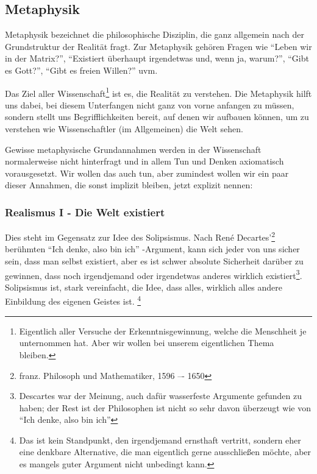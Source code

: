 
\subsection{Metaphysik}

Metaphysik bezeichnet die philosophische Disziplin, die ganz allgemein nach der Grundstruktur der Realität fragt.\cite{sep-metaphysics}
Zur Metaphysik gehören Fragen wie \enquote{Leben wir in der Matrix?},
\enquote{Existiert überhaupt irgendetwas und, wenn ja, warum?}, \enquote{Gibt es Gott?}, \enquote{Gibt es freien Willen?} uvm.

Das Ziel aller Wissenschaft\footnote{Eigentlich aller Versuche der Erkenntnisgewinnung,
    welche die Menschheit je unternommen hat. Aber wir wollen bei unserem eigentlichen Thema bleiben.}
ist es, die Realität zu verstehen. Die Metaphysik hilft uns dabei, bei diesem Unterfangen nicht ganz von vorne anfangen
zu müssen, sondern stellt uns Begrifflichkeiten bereit, auf denen wir aufbauen können, um zu verstehen wie
Wissenschaftler (im Allgemeinen) die Welt sehen.

\medskip

Gewisse metaphysische Grundannahmen werden in der Wissenschaft normalerweise nicht hinterfragt und in allem Tun und
Denken axiomatisch vorausgesetzt. Wir wollen das auch tun, aber zumindest wollen wir ein paar dieser Annahmen, die sonst
implizit bleiben, jetzt explizit nennen:

\subsubsection{Realismus I - Die Welt existiert}

Dies steht im Gegensatz zur Idee des Solipsismus. Nach René Decartes'\footnote{franz. Philosoph und Mathematiker, 1596 –- 1650} berühmten \enquote{Ich denke, also bin ich}
-Argument, kann sich jeder von uns sicher sein, dass man selbst existiert, aber es ist schwer absolute Sicherheit
darüber zu gewinnen, dass noch irgendjemand oder irgendetwas anderes wirklich existiert\footnote
{Descartes war der Meinung,
    auch dafür wasserfeste Argumente gefunden zu haben; der Rest ist der Philosophen ist nicht so sehr davon
    überzeugt wie von \enquote{Ich denke, also bin ich}}. Solipsismus ist, stark vereinfacht, die Idee, dass alles, wirklich alles andere Einbildung des eigenen Geistes ist.
\footnote
{Das ist kein Standpunkt, den irgendjemand ernsthaft vertritt, sondern eher eine denkbare Alternative,
    die man eigentlich gerne ausschließen möchte, aber es mangels guter Argument nicht unbedingt kann.}

